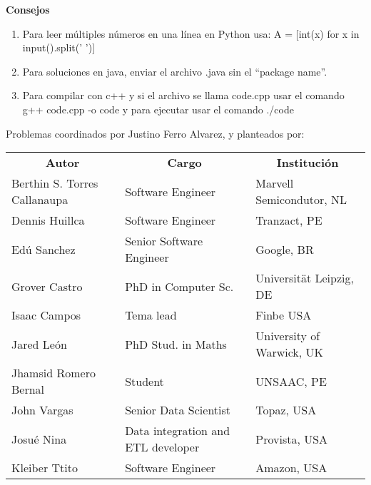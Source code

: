 \textbf{Consejos}
\begin{enumerate}
    \item Para leer múltiples números en una línea en Python usa: A = [int(x) for x in input().split(' ')]
    \item Para soluciones en java, enviar el archivo .java sin el ``package name''.
    \item Para compilar con c++ y si el archivo se llama code.cpp usar el comando g++ code.cpp -o code y para ejecutar usar el comando ./code
\end{enumerate}

\begin{center}
    \vspace{1cm}
    Problemas coordinados por Justino Ferro Alvarez, y planteados por:
    \vspace{0.3cm}
    \begin{tabular}{ l l l}
        \multicolumn{1}{c}{\textbf{Autor}} & \multicolumn{1}{c}{\textbf{Cargo}} & \multicolumn{1}{c}{\textbf{Institución}}  \\
        Berthin S. Torres Callanaupa & Software Engineer & Marvell Semicondutor, NL\\
        Dennis Huillca & Software Engineer & Tranzact, PE\\
        Edú Sanchez & Senior Software Engineer & Google, BR\\
        Grover Castro & PhD in Computer Sc. & Universität Leipzig, DE\\
        Isaac Campos & Tema lead &  Finbe USA\\
        Jared León & PhD Stud. in Maths & University of Warwick, UK\\
        Jhamsid Romero Bernal & Student & UNSAAC, PE\\
        John Vargas & Senior Data Scientist & Topaz, USA\\
        Josué Nina & Data integration and ETL developer & Provista, USA\\
        Kleiber Ttito & Software Engineer & Amazon, USA \\        
    \end{tabular}
\end{center}
